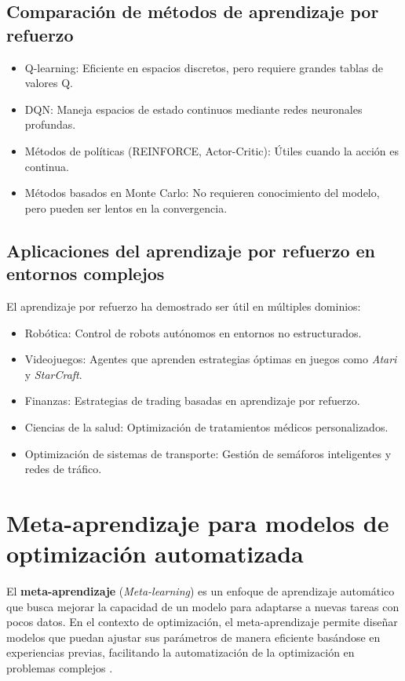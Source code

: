 \begin{itemize}
		\subsection{Comparación de métodos de aprendizaje por refuerzo}
		
		\begin{itemize}
			\item Q-learning: Eficiente en espacios discretos, pero requiere grandes tablas de valores Q.
			\item DQN: Maneja espacios de estado continuos mediante redes neuronales profundas.
			\item Métodos de políticas (REINFORCE, Actor-Critic): Útiles cuando la acción es continua.
			\item Métodos basados en Monte Carlo: No requieren conocimiento del modelo, pero pueden ser lentos en la convergencia.
		\end{itemize}
		
		\subsection{Aplicaciones del aprendizaje por refuerzo en entornos complejos}
		
		El aprendizaje por refuerzo ha demostrado ser útil en múltiples dominios:
		
		\begin{itemize}
			\item Robótica: Control de robots autónomos en entornos no estructurados.
			\item Videojuegos: Agentes que aprenden estrategias óptimas en juegos como \textit{Atari} y \textit{StarCraft}.
			\item Finanzas: Estrategias de trading basadas en aprendizaje por refuerzo.
			\item Ciencias de la salud: Optimización de tratamientos médicos personalizados.
			\item Optimización de sistemas de transporte: Gestión de semáforos inteligentes y redes de tráfico.
		\end{itemize}
		\section{Meta-aprendizaje para modelos de optimización automatizada}
		
		El \textbf{meta-aprendizaje} (\textit{Meta-learning}) es un enfoque de aprendizaje automático que busca mejorar la capacidad de un modelo para adaptarse a nuevas tareas con pocos datos. En el contexto de optimización, el meta-aprendizaje permite diseñar modelos que puedan ajustar sus parámetros de manera eficiente basándose en experiencias previas, facilitando la automatización de la optimización en problemas complejos \cite{hospedales2021meta}.
		

\end{itemize}
